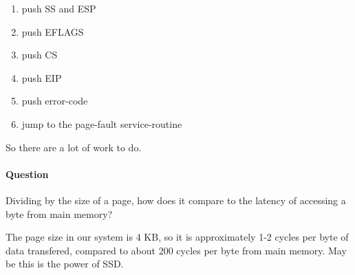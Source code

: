 \begin{enumerate}
\item push  SS  and  ESP
\item push  EFLAGS
\item push  CS
\item push  EIP
\item push  error-code
\item jump to the page-fault service-routine  
\end{enumerate}

So there are a lot of work to do. 


\paragraph{Question} Dividing by the size of a page, how does it compare to the latency of accessing a byte from main memory?

The page size in our system is 4 KB, so it is approximately 1-2 cycles per byte of data transfered, compared to about 200 cycles per byte from main memory. May be this is the power of SSD.
